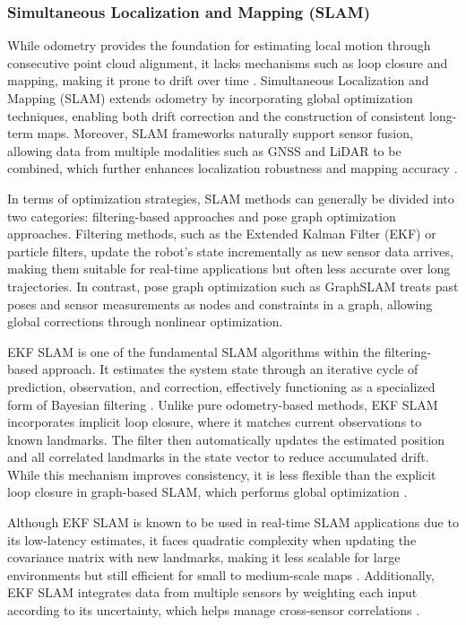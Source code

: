 \documentclass[12pt, a4paper]{article}
\begin{document}
\subsubsection{Simultaneous Localization and Mapping (SLAM)}
While odometry provides the foundation for estimating local motion through
consecutive point cloud alignment, it lacks mechanisms such as loop closure and
mapping, making it prone to drift over time \cite{liu2019optimized,
thrun2000probabilistic}. Simultaneous Localization and Mapping (SLAM) extends
odometry by incorporating global optimization techniques, enabling both drift
correction and the construction of consistent long-term maps. Moreover, SLAM
frameworks naturally support sensor fusion, allowing data from multiple
modalities such as GNSS and LiDAR to be combined, which further enhances
localization robustness and mapping accuracy \cite{xu2022review, rs11091009}.

In terms of optimization strategies, SLAM methods can generally be divided into
two categories: filtering-based approaches and pose graph optimization
approaches. Filtering methods, such as the Extended Kalman Filter (EKF) or
particle filters, update the robot’s state incrementally as new sensor data
arrives, making them suitable for real-time applications but often less accurate
over long trajectories. In contrast, pose graph optimization such as GraphSLAM
treats past poses and sensor measurements as nodes and constraints in a graph,
allowing global corrections through nonlinear optimization. 

EKF SLAM is one of the fundamental SLAM algorithms within the filtering-based
approach. It estimates the system state through an iterative cycle of
prediction, observation, and correction, effectively functioning as a
specialized form of Bayesian filtering \cite{paz2007ekf}. Unlike pure
odometry-based methods, EKF SLAM incorporates implicit loop closure, where it
matches current observations to known landmarks. The filter then automatically
updates the estimated position and all correlated landmarks in the state vector
to reduce accumulated drift. While this mechanism improves consistency, it is
less flexible than the explicit loop closure in graph-based SLAM, which performs
global optimization \cite{khan2021comparative}. 

Although EKF SLAM is known to be used in real-time SLAM applications due to its
low-latency estimates, it faces quadratic complexity when updating the
covariance matrix with new landmarks, making it less scalable for large
environments but still efficient for small to medium-scale maps
\cite{gil2015occupancy}. Additionally, EKF SLAM integrates data from multiple
sensors by weighting each input according to its uncertainty, which helps manage
cross-sensor correlations \cite{oh2010symmetrical}. 
\end{document}
